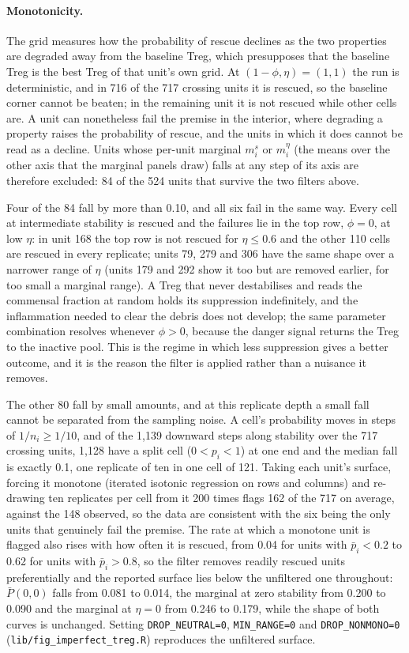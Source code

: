 \documentclass[11pt]{article}
\begin{document}
\paragraph{Monotonicity.}
The grid measures how the probability of rescue declines as the two properties
are degraded away from the baseline Treg, which presupposes that the baseline
Treg is the best Treg of that unit's own grid. At $(1-\phi, \eta) = (1,1)$ the
run is deterministic, and in 716 of the 717 crossing units it is rescued, so the
baseline corner cannot be beaten; in the remaining unit it is not rescued while
other cells are. A unit can nonetheless fail the premise in the interior, where
degrading a property raises the probability of rescue, and the units in which it
does cannot be read as a decline. Units whose per-unit marginal $m^s_i$ or
$m^\eta_i$ (the means over the other axis that the marginal panels draw) falls at
any step of its axis are therefore excluded: 84 of the 524 units that survive the
two filters above.

Four of the 84 fall by more than 0.10, and all six fail in the same way. Every
cell at intermediate stability is rescued and the failures lie in the top row,
$\phi = 0$, at low $\eta$: in unit 168 the top row is not rescued for
$\eta \le 0.6$ and the other 110 cells are rescued in every replicate; units 79, 279 and
306 have the same shape over a narrower range of $\eta$ (units 179 and 292 show it
too but are removed earlier, for too small a marginal range). A
Treg that never destabilises and reads the commensal fraction at random holds
its suppression indefinitely, and the inflammation needed to clear the debris
does not develop; the same parameter combination resolves whenever $\phi > 0$,
because the danger signal returns the Treg to the inactive pool. This is the
regime in which less suppression gives a better outcome, and it is the reason
the filter is applied rather than a nuisance it removes.

The other 80 fall by small amounts, and at this replicate depth a small fall
cannot be separated from the sampling noise. A cell's probability moves in steps
of $1/n_i \ge 1/10$, and of the 1{,}139 downward steps along stability over the
717 crossing units, 1{,}128 have a split cell ($0 < p_i < 1$) at one end and the
median fall is exactly 0.1, one replicate of ten in one cell of 121. Taking each
unit's surface, forcing it monotone (iterated isotonic regression on rows and
columns) and re-drawing ten replicates per cell from it 200 times flags 162 of
the 717 on average, against the 148 observed, so the data are consistent with
the six being the only units that genuinely fail the premise. The rate at which
a monotone unit is flagged also rises with how often it is rescued, from 0.04
for units with $\bar p_i < 0.2$ to 0.62 for units with $\bar p_i > 0.8$, so the
filter removes readily rescued units preferentially and the reported surface
lies below the unfiltered one throughout: $\bar P(0,0)$ falls from 0.081 to
0.014, the marginal at zero stability from 0.200 to 0.090 and the marginal at
$\eta = 0$ from 0.246 to 0.179, while the shape of both curves is unchanged.
Setting \texttt{DROP\_NEUTRAL=0}, \texttt{MIN\_RANGE=0} and
\texttt{DROP\_NONMONO=0} (\texttt{lib/fig\_imperfect\_treg.R}) reproduces the
unfiltered surface.
\end{document}
